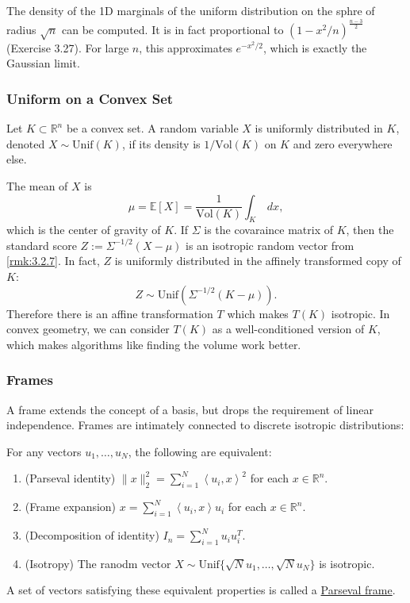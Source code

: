 \begin{remark}
\label{rmk:3.3.10}
The density of the 1D marginals of the uniform distribution on the sphre of radius $\sqrt{n}$ can be 
computed. It is in fact proportional to $(1 - x^2 / n)^{\frac{n-3}{2}}$ (Exercise 3.27). For large $n$, 
this approximates $e^{-x^2 / 2}$, which is exactly the Gaussian limit.
\end{remark}


\subsubsection{Uniform on a Convex Set}
Let $K \subset \mathbb{R}^n$ be a convex set. A random variable $X$ is uniformly distributed 
in $K$, denoted $X \sim \mathrm{Unif}(K)$, if its density is $1/\mathrm{Vol}(K)$ on $K$ and zero everywhere 
else.

The mean of $X$ is 
\[ \mu = \mathbb{E}[X] = \frac{1}{\mathrm{Vol}(K)} \int_{K}^{}  \ dx, \]
which is the center of gravity of $K$. If $\Sigma$ is the covaraince matrix of $K$, then the standard score 
$Z := \Sigma^{-1/2}(X - \mu)$ is an isotropic random vector from \cref{rmk:3.2.7}. In fact, $Z$ is uniformly 
distributed in the affinely transformed copy of $K$: 
\[ Z \sim \mathrm{Unif}\left( \Sigma^{-1/2}(K - \mu) \right). \]
Therefore there is an affine transformation $T$ which makes $T(K)$ isotropic. In convex geometry, we can 
consider $T(K)$ as a well-conditioned version of $K$, which makes algorithms like finding the volume work 
better.


\subsubsection{Frames}
A frame extends the concept of a basis, but drops the requirement of linear independence. Frames are intimately 
connected to discrete isotropic distributions: 
\begin{proposition}
\label{prop:3.3.11}
For any vectors $u_1, \dots, u_N$, the following are equivalent: 
\begin{enumerate}[label=(\roman*)]
	\item (Parseval identity) $\lVert x \rVert_{2}^2 = \sum_{i = 1}^{N} \left\langle u_i, x \right\rangle^2$ 
	for each $x \in \mathbb{R}^n$.
	\item (Frame expansion) $x = \sum_{i = 1}^{N} \left\langle u_i, x \right\rangle u_i$ for each $x \in 
	\mathbb{R}^n$.
	\item (Decomposition of identity) $I_n = \sum_{i = 1}^{N} u_i u_i^T$.
	\item (Isotropy) The ranodm vector $X \sim \mathrm{Unif}\{\sqrt{N}u_1, \dots, \sqrt{N}u_N\}$ is isotropic.
\end{enumerate}
A set of vectors satisfying these equivalent properties is called a \underline{Parseval frame}.
\end{proposition}

